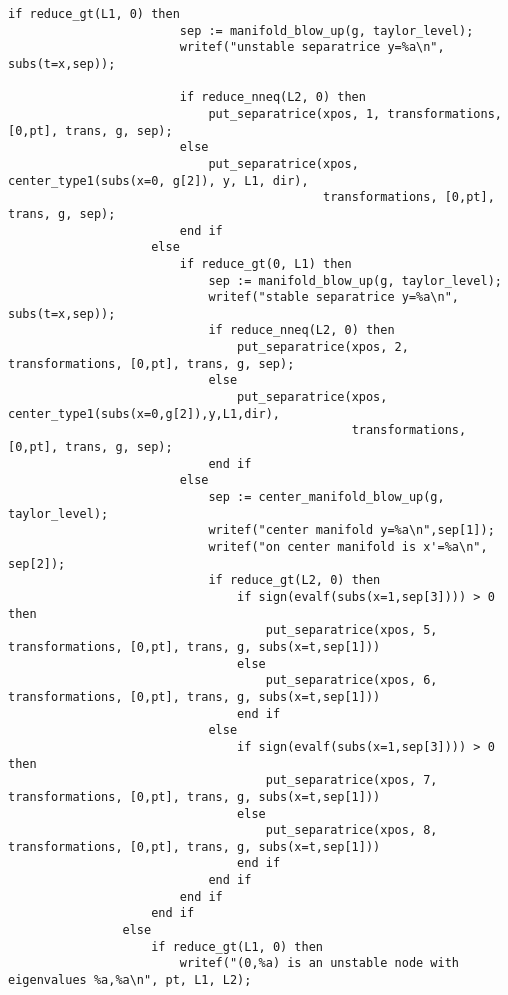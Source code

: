 \documentclass[a4paper,10pt]{article}
\begin{document}
\begin{lstlisting}[name=blowup]
                    if reduce_gt(L1, 0) then
                        sep := manifold_blow_up(g, taylor_level);
                        writef("unstable separatrice y=%a\n", subs(t=x,sep));

                        if reduce_nneq(L2, 0) then
                            put_separatrice(xpos, 1, transformations, [0,pt], trans, g, sep);
                        else
                            put_separatrice(xpos, center_type1(subs(x=0, g[2]), y, L1, dir),
                                            transformations, [0,pt], trans, g, sep);
                        end if
                    else
                        if reduce_gt(0, L1) then
                            sep := manifold_blow_up(g, taylor_level);
                            writef("stable separatrice y=%a\n", subs(t=x,sep));
                            if reduce_nneq(L2, 0) then
                                put_separatrice(xpos, 2, transformations, [0,pt], trans, g, sep);
                            else
                                put_separatrice(xpos, center_type1(subs(x=0,g[2]),y,L1,dir),
                                                transformations, [0,pt], trans, g, sep);
                            end if
                        else
                            sep := center_manifold_blow_up(g, taylor_level);
                            writef("center manifold y=%a\n",sep[1]);
                            writef("on center manifold is x'=%a\n", sep[2]);
                            if reduce_gt(L2, 0) then
                                if sign(evalf(subs(x=1,sep[3]))) > 0 then
                                    put_separatrice(xpos, 5, transformations, [0,pt], trans, g, subs(x=t,sep[1]))
                                else
                                    put_separatrice(xpos, 6, transformations, [0,pt], trans, g, subs(x=t,sep[1]))
                                end if
                            else
                                if sign(evalf(subs(x=1,sep[3]))) > 0 then
                                    put_separatrice(xpos, 7, transformations, [0,pt], trans, g, subs(x=t,sep[1]))
                                else
                                    put_separatrice(xpos, 8, transformations, [0,pt], trans, g, subs(x=t,sep[1]))
                                end if
                            end if
                        end if
                    end if
                else
                    if reduce_gt(L1, 0) then
                        writef("(0,%a) is an unstable node with eigenvalues %a,%a\n", pt, L1, L2);


\end{lstlisting}
\end{document}
